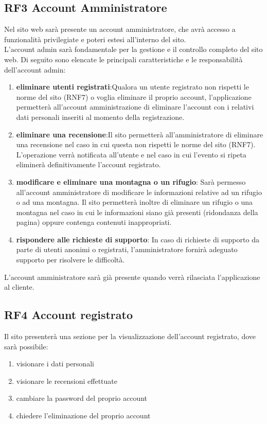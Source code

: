 \documentclass[a4paper,12pt]{article}
\begin{document}
\subsection*{RF3 Account Amministratore}
Nel sito web sarà presente un account amministratore, che avrà accesso a funzionalità privilegiate e poteri estesi all'interno del sito.\\
L'account admin sarà fondamentale per la gestione e il controllo completo del sito web. Di seguito sono elencate le principali caratteristiche e le responsabilità dell'account admin:
 \begin{enumerate} [leftmargin=40pt]
     \item \textbf{eliminare utenti registrati}:\newline Qualora un utente registrato non rispetti le norme del sito (RNF7) o voglia eliminare il proprio account, l'applicazione permetterà all'account amministrazione di eliminare l'account con i relativi dati personali inseriti al momento della registrazione.
     \item \textbf{eliminare una recensione}:\newline Il sito permetterà all'amministratore di eliminare una recensione nel caso in cui questa non rispetti le norme del sito (RNF7). L'operazione verrà notificata all'utente e nel caso in cui l'evento si ripeta eliminerà definitivamente l'account registrato. 
     \item \textbf{modificare e eliminare una montagna o un rifugio}:\newline
    Sarà permesso all'account amministratore di modificare le informazioni relative ad un rifugio o ad una montagna. Il sito permetterà inoltre di eliminare un rifugio o una montagna nel caso in cui le informazioni siano già presenti (ridondanza della pagina) oppure contenga contenuti inappropriati. 
    \item \textbf{rispondere alle richieste di supporto}:\newline
    In caso di richieste di supporto da parte di utenti anonimi o registrati, l'amministratore fornirà adeguato supporto per risolvere le difficoltà.
    
    
 
 \end{enumerate}
 L'account amministratore sarà già presente quando verrà rilasciata l'applicazione al cliente. 


\subsection*{RF4 Account registrato}
 Il sito presenterà una sezione per la visualizzazione dell'account registrato, dove sarà possibile:
 \begin{enumerate} [leftmargin=40pt]
     \item visionare i dati personali
     \item visionare le recensioni effettuate
     \item cambiare la password del proprio account
     \item chiedere l'eliminazione del proprio account
 \end{enumerate}
\end{document}
